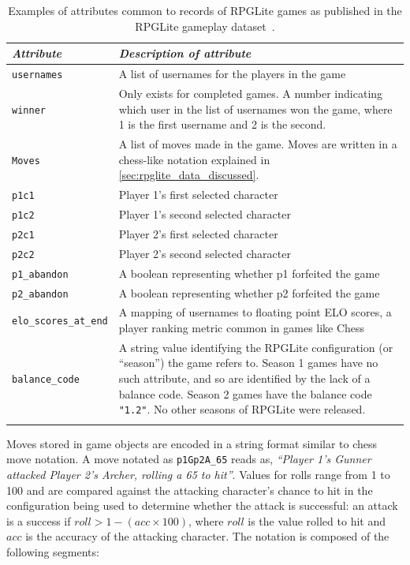 \begin{table}
  \centering
  \begin{tabular}{@{}lp{}@{}}
    \toprule{}
    \emph{Attribute} & \emph{Description of attribute}\\
    \midrule{}
    \rule{0pt}{2em}\lstinline[]$usernames$ & A list of usernames for the players in the game\\
    \rule{0pt}{2em}\lstinline[]$winner$ & Only exists for completed games. A number indicating
    which user in the list of usernames won the game, where 1 is the first
    username and 2 is the second. \\
    \rule{0pt}{2em}\lstinline[]$Moves$ & A list of moves made in the game. Moves are written in
   a chess-like notation explained in \cref{sec:rpglite_data_discussed}. \\
    \rule{0pt}{2em}\lstinline[]$p1c1$ & Player 1's first selected character \\
    \rule{0pt}{2em}\lstinline[]$p1c2$ & Player 1's second selected character \\
    \rule{0pt}{2em}\lstinline[]$p2c1$ & Player 2's first selected character  \\
    \rule{0pt}{2em}\lstinline[]$p2c2$ & Player 2's second selected character  \\
    \rule{0pt}{2em}\lstinline[]$p1_abandon$ & A boolean representing whether p1 forfeited the game \\
    \rule{0pt}{2em}\lstinline[]$p2_abandon$ & A boolean representing whether p2 forfeited the game \\
    \rule{0pt}{2em}\lstinline[]$elo_scores_at_end$ & A mapping of usernames to floating point
    ELO scores, a player ranking metric common in games like Chess~\cite{elo_ratings} \\
    \rule{0pt}{2em}\lstinline[]$balance_code$ & A string value identifying the RPGLite
    configuration (or ``season'') the game refers to. Season 1 games have no
    such attribute, and so are identified by the lack of a balance code. Season
    2 games have the balance code \lstinline[]$"1.2"$. No other seasons of
    RPGLite were released.\\
    \bottomrule{}
  \end{tabular}
  \caption{Examples of attributes common to records of RPGLite games as published in the RPGLite gameplay dataset~\cite{rpglite_dataset}.}
  \label{fig:gamedoc_attributes}
\end{table}

Moves stored in game objects are encoded in a string format similar to chess
move notation. A move notated as \lstinline{p1Gp2A_65} reads as, \emph{``Player
1's Gunner attacked Player 2's Archer, rolling a 65 to hit''}. Values for rolls
range from 1 to 100 and are compared against the attacking character's chance to
hit in the configuration being used to determine whether the attack is
successful: an attack is a success if $roll > 1 - (acc \times 100)$, where
$roll$ is the value rolled to hit and $acc$ is the accuracy of the attacking
character. The notation is composed of the following segments: 

